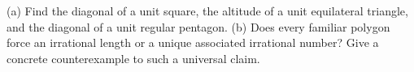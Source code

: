(a) Find the diagonal of a unit square, the altitude of a unit equilateral triangle, and the diagonal of a unit regular pentagon. (b) Does every familiar polygon force an irrational length or a unique associated irrational number? Give a concrete counterexample to such a universal claim.

